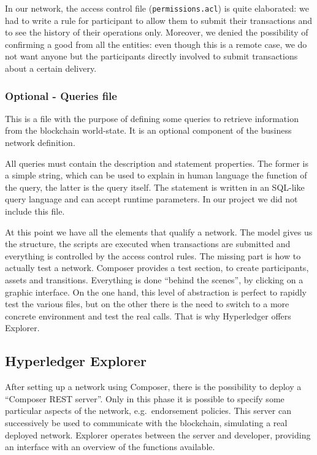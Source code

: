 In our network, the access control file (\texttt{permissions.acl}) is quite elaborated: we had to write a rule for participant to allow them to submit their transactions and to see the history of their operations only. Moreover, we denied the possibility of confirming a good from all the entities: even though this is a remote case, we do not want anyone but the participants directly involved to submit transactions about a certain delivery.

\subsubsection{Optional - Queries file}
This is a file with the purpose of defining some queries to retrieve information from the blockchain world-state. It is an optional component of the business network definition. 

All queries must contain the description and statement properties. The former is a simple string, which can be used to explain in human language the function of the query, the latter is the query itself. The statement is written in an SQL-like query language and can accept runtime parameters. In our project we did not include this file.
\vspace{11pt}

At this point we have all the elements that qualify a network. The model gives us the structure, the scripts are executed when transactions are submitted and everything is controlled by the access control rules. The missing part is how to actually test a network. Composer provides a test section, to create participants, assets and transitions. Everything is done ``behind the scenes'', by clicking on a graphic interface. On the one hand, this level of abstraction is perfect to rapidly test the various files, but on the other there is the need to switch to a more concrete environment and test the real calls. That is why Hyperledger offers Explorer.

\subsection{Hyperledger Explorer}
After setting up a network using Composer, there is the possibility to deploy a ``Composer REST server''. Only in this phase it is possible to specify some particular aspects of the network, e.g.\ endorsement policies. This server can successively be used to communicate with the blockchain, simulating a real deployed network. Explorer operates between the server and developer, providing an interface with an overview of the functions available. 


